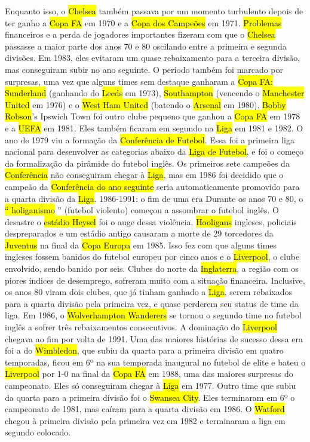 \documentclass[a4paper,12pt]{article}
\begin{document}
Enquanto isso, o \hl{Chelsea} também passava por um momento turbulento depois de ter ganho a \hl{Copa FA} em 1970 e a \hl{Copa dos Campeões} em 1971. \hl{Problemas} financeiros e a perda de jogadores importantes fizeram com que o \hl{Chelsea} passasse a maior parte dos anos 70 e 80 oscilando entre a primeira e segunda divisões. Em 1983, eles evitaram um quase rebaixamento para a terceira divisão, mas conseguiram subir no ano seguinte.
O período também foi marcado por surpresas, uma vez que alguns times sem destaque ganharam a \hl{Copa FA: Sunderland} (ganhando do \hl{Leeds} em 1973), \hl{Southampton} (vencendo o \hl{Manchester United} em 1976) e o \hl{West Ham United} (batendo o \hl{Arsenal} em 1980). \hl{Bobby Robson}’s Ipswich Town foi outro clube pequeno que ganhou a \hl{Copa FA} em 1978 e a \hl{UEFA} em 1981. Eles também ficaram em segundo na \hl{Liga} em 1981 e 1982.
O ano de 1979 viu a formação da \hl{Conferência de Futebol}. Essa foi a primeira liga nacional para desenvolver as categorias abaixo da \hl{Liga de Futebol}, e foi o começo da formalização da pirâmide do futebol inglês. Os primeiros sete campeões da \hl{Conferência} não conseguiram chegar à \hl{Liga}, mas em 1986 foi decidido que o campeão da \hl{Conferência do ano seguinte} seria automaticamente promovido para a quarta divisão da \hl{Liga}.
1986-1991: o fim de uma era
Durante os anos 70 e 80, o \hl{“ holiganismo} ” (futebol violento) começou a assombrar o futebol inglês. O desastre o \hl{estádio Heysel} foi o auge dessa violência. \hl{Hooligans} ingleses, policiais despreparados e um estádio antigo causaram a morte de 29 torcedores da \hl{Juventus} na final da \hl{Copa Europa} em 1985. Isso fez com que alguns times ingleses fossem banidos do futebol europeu por cinco anos e o \hl{Liverpool}, o clube envolvido, sendo banido por seis. Clubes do norte da \hl{Inglaterra}, a região com os piores índices de desemprego, sofreram muito com a situação financeira. Inclusive, os anos 80 viram dois clubes, que já tinham ganhado a \hl{Liga}, serem rebaixados para a quarta divisão pela primeira vez, e quase perderem seu status de time da liga. Em 1986, o \hl{Wolverhampton Wanderers} se tornou o segundo time no futebol inglês a sofrer três rebaixamentos consecutivos.
A dominação do \hl{Liverpool} chegava ao fim por volta de 1991. Uma das maiores histórias de sucesso dessa era foi a do \hl{Wimbledon}, que subiu da quarta para a primeira divisão em quatro temporadas, ficou em 6º na sua temporada inaugural no futebol de elite e bateu o \hl{Liverpool} por 1-0 na final da \hl{Copa FA} em 1988, uma das maiores surpresas do campeonato. Eles só conseguiram chegar à \hl{Liga} em 1977. Outro time que subiu da quarta para a primeira divisão foi o \hl{Swansea City}. Eles terminaram em 6º o campeonato de 1981, mas caíram para a quarta divisão em 1986. O \hl{Watford} chegou à primeira divisão pela primeira vez em 1982 e terminaram a liga em segundo colocado.
\end{document}
